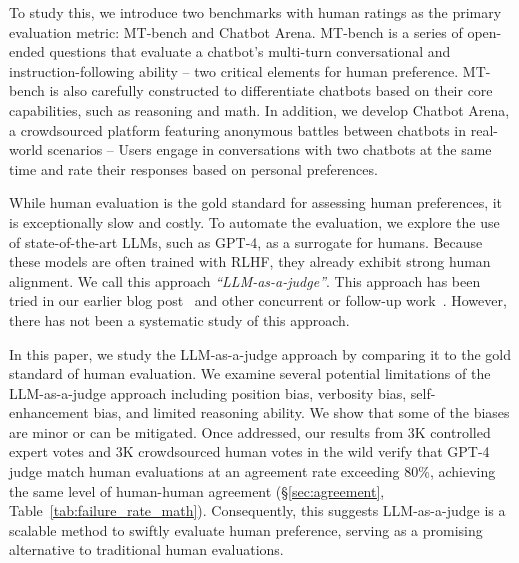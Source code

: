 To study this, we introduce two benchmarks with human ratings as the primary evaluation metric: MT-bench and Chatbot Arena.
MT-bench is a series of open-ended questions that evaluate a chatbot's multi-turn conversational and instruction-following ability -- two critical elements for human preference. MT-bench is also carefully constructed to differentiate chatbots based on their core capabilities, such as reasoning and math.
In addition, we develop Chatbot Arena, a crowdsourced platform featuring anonymous battles between chatbots in real-world scenarios -- Users engage in conversations with two chatbots at the same time and rate their responses based on personal preferences. 



While human evaluation is the gold standard for assessing human preferences, it is exceptionally slow and costly.
To automate the evaluation, we explore the use of state-of-the-art LLMs, such as GPT-4, as a surrogate for humans. 
Because these models are often trained with RLHF, they already exhibit strong human alignment.
We call this approach \emph{``LLM-as-a-judge''}. 
This approach has been tried in our earlier blog post~\cite{vicuna2023} and other concurrent or follow-up work~\cite{bubeck2023sparks, openaievals, dubois2023alpacafarm, dettmers2023qlora, zhou2023lima,gudibande2023false,peng2023instruction,wang2023large,chiang2023can,wang2023far}.
However, there has not been a systematic study of this approach. %


In this paper, we study the LLM-as-a-judge approach by comparing it to the gold standard of human evaluation. 
We examine several potential limitations of the LLM-as-a-judge approach including position bias, verbosity bias, self-enhancement bias, and limited reasoning ability.
We show that some of the biases are minor or can be mitigated. 
Once addressed, our results from 3K controlled expert votes and 3K crowdsourced human votes in the wild verify that GPT-4 judge match human evaluations at an agreement rate exceeding 80\%, achieving the same level of human-human agreement (\S\ref{sec:agreement}, Table~\ref{tab:failure_rate_math}).
Consequently, this suggests LLM-as-a-judge is a scalable method to swiftly evaluate human preference, serving as a promising alternative to traditional human evaluations.  \\

